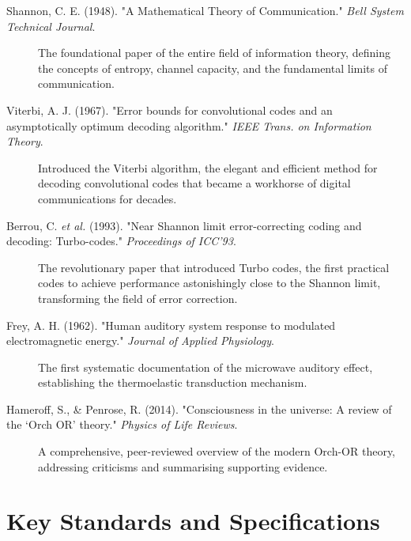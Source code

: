 \begin{description}
    \item[Shannon, C. E. (1948). "A Mathematical Theory of Communication." \emph{Bell System Technical Journal}.] The foundational paper of the entire field of information theory, defining the concepts of entropy, channel capacity, and the fundamental limits of communication.
    \item[Viterbi, A. J. (1967). "Error bounds for convolutional codes and an asymptotically optimum decoding algorithm." \emph{IEEE Trans. on Information Theory}.] Introduced the Viterbi algorithm, the elegant and efficient method for decoding convolutional codes that became a workhorse of digital communications for decades.
    \item[Berrou, C. \textit{et al.} (1993). "Near Shannon limit error-correcting coding and decoding: Turbo-codes." \emph{Proceedings of ICC'93}.] The revolutionary paper that introduced Turbo codes, the first practical codes to achieve performance astonishingly close to the Shannon limit, transforming the field of error correction.
    \item[Frey, A. H. (1962). "Human auditory system response to modulated electromagnetic energy." \emph{Journal of Applied Physiology}.] The first systematic documentation of the microwave auditory effect, establishing the thermoelastic transduction mechanism.
    \item[Hameroff, S., \& Penrose, R. (2014). "Consciousness in the universe: A review of the `Orch OR' theory." \emph{Physics of Life Reviews}.] A comprehensive, peer-reviewed overview of the modern Orch-OR theory, addressing criticisms and summarising supporting evidence.
\end{description}

\section{Key Standards and Specifications}

